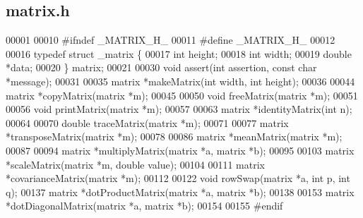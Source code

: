 \subsection{matrix.\+h}
\label{matrix_8h_source}

\begin{DoxyCode}
00001 
00010 \textcolor{preprocessor}{#ifndef \_MATRIX\_H\_}
00011 \textcolor{preprocessor}{#define \_MATRIX\_H\_}
00012 
00016 \textcolor{keyword}{typedef} \textcolor{keyword}{struct }_matrix \{
00017   \textcolor{keywordtype}{int} height;
00018   \textcolor{keywordtype}{int} width;
00019   \textcolor{keywordtype}{double} *data;
00020 \} matrix;
00021 
00030 \textcolor{keywordtype}{void} assert(\textcolor{keywordtype}{int} assertion, \textcolor{keyword}{const} \textcolor{keywordtype}{char} *message);
00031 
00035 matrix *makeMatrix(\textcolor{keywordtype}{int} width, \textcolor{keywordtype}{int} height);
00036 
00044 matrix *copyMatrix(matrix *m);
00045 
00050 \textcolor{keywordtype}{void} freeMatrix(matrix *m);
00051 
00056 \textcolor{keywordtype}{void} printMatrix(matrix *m);
00057 
00063 matrix *identityMatrix(\textcolor{keywordtype}{int} n);
00064 
00070 \textcolor{keywordtype}{double} traceMatrix(matrix *m);
00071 
00077 matrix *transposeMatrix(matrix *m);
00078 
00086 matrix *meanMatrix(matrix *m);
00087 
00094 matrix *multiplyMatrix(matrix *a, matrix *b);
00095 
00103 matrix *scaleMatrix(matrix *m, \textcolor{keywordtype}{double} value);
00104 
00111 matrix *covarianceMatrix(matrix *m);
00112 
00122 \textcolor{keywordtype}{void} rowSwap(matrix *a, \textcolor{keywordtype}{int} p, \textcolor{keywordtype}{int} q);
00137 matrix *dotProductMatrix(matrix *a, matrix *b);
00138 
00153 matrix *dotDiagonalMatrix(matrix *a, matrix *b);
00154 
00155 \textcolor{preprocessor}{#endif}
\end{DoxyCode}
